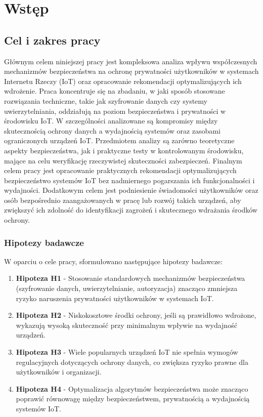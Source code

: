 \chapter{Wstęp}

\section{Cel i zakres pracy}
Głównym celem niniejszej pracy jest kompleksowa analiza wpływu współczesnych mechanizmów bezpieczeństwa na ochronę prywatności użytkowników w systemach Internetu Rzeczy (IoT) oraz opracowanie rekomendacji optymalizujących ich wdrożenie. Praca koncentruje się na zbadaniu, w jaki sposób stosowane rozwiązania techniczne, takie jak szyfrowanie danych czy systemy uwierzytelniania, oddziałują na poziom bezpieczeństwa i prywatności w środowisku IoT. W szczególności analizowane są kompromisy między skutecznością ochrony danych a wydajnością systemów oraz zasobami ograniczonych urządzeń IoT.
Przedmiotem analizy są zarówno teoretyczne aspekty bezpieczeństwa, jak i praktyczne testy w kontrolowanym środowisku, mające na celu weryfikację rzeczywistej skuteczności zabezpieczeń.
Finalnym celem pracy jest opracowanie praktycznych rekomendacji optymalizujących bezpieczeństwo systemów IoT bez nadmiernego pogarszania ich funkcjonalności i wydajności. Dodatkowym celem jest podniesienie świadomości użytkowników oraz osób bezpośrednio zaangażowanych w pracę lub rozwój takich urządzeń, aby zwiększyć ich zdolność do identyfikacji zagrożeń i skutecznego wdrażania środków ochrony.
\subsection{Hipotezy badawcze}
W oparciu o cele pracy, sformułowano następujące hipotezy badawcze:

\begin{enumerate}[]
    \item \textbf{Hipoteza H1} - Stosowanie standardowych mechanizmów bezpieczeństwa (szyfrowanie danych, uwierzytelnianie, autoryzacja) znacząco zmniejsza ryzyko naruszenia prywatności użytkowników w systemach IoT.
    \item \textbf{Hipoteza H2} - Niskokosztowe środki ochrony, jeśli są prawidłowo wdrożone, wykazują wysoką skuteczność przy minimalnym wpływie na wydajność urządzeń.
    \item \textbf{Hipoteza H3} - Wiele popularnych urządzeń IoT nie spełnia wymogów regulacyjnych dotyczących ochrony danych, co zwiększa ryzyko prawne dla użytkowników i organizacji.
    \item \textbf{Hipoteza H4} - Optymalizacja algorytmów bezpieczeństwa może znacząco poprawić równowagę między bezpieczeństwem, prywatnością a wydajnością systemów IoT.
\end{enumerate}

